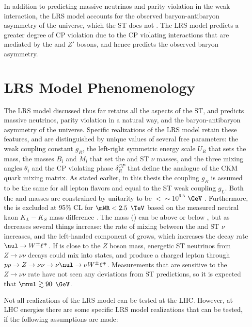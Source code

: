 In addition to predicting massive neutrinos and parity violation in the weak interaction, the LRS model accounts 
for the observed baryon-antibaryon asymmetry of the universe, which the ST does not \cite{surveyOfExtensions}.  
The LRS model predicts a greater degree of CP violation due to the CP violating interactions that are mediated by 
the \WR and $Z'$ bosons, and hence predicts the observed baryon asymmetry.


\section{LRS Model Phenomenology}
\label{sec:lrsPhenomenology}
The LRS model discussed thus far retains all the aspects of the ST, and predicts 
massive neutrinos, parity violation in a natural way, and the baryon-antibaryon asymmetry of the universe.  
Specific realizations of the LRS model retain these features, and are distinguished by unique values of 
several free parameters: the weak coupling constant $g_{R}$, the left-right symmetric energy scale $U_{R}$ 
that sets the \WR mass, the masses $B_{i}$ and $M_{i}$ that set the \nul and ST $\nu$ masses, and the three 
mixing angles $\theta_{i}$ and the CP violating phase $\delta_{R}^{CP}$ that define the \WR analogue 
of the CKM quark mixing matrix.  As stated earlier, in this thesis the coupling $g_{R}$ is assumed to be 
the same for all lepton flavors and equal to the ST weak coupling $g_{L}$.  Both the \WR and \nul masses 
are constrained by unitarity to be $< \sim10^{6.5}$ $\GeV$ \cite{lrsMassConstraints}.  Furthermore, the \WR is 
excluded at 95\% CL for $\mWR < 2.5$ $\TeV$ based on the measured neutral kaon $K_{L} - K_{S}$ mass difference 
\cite{mwrBoundFromNeutralKaons}.  The \nul mass (\mnul) can be above or below \mWR, but as \mnul decreases 
several things increase: the rate of mixing between the \nul and ST $\nu$ increases, and the left-handed 
component of \nul grows, which increases the decay rate $\nul \rightarrow W^{\pm}\ell^{\mp}$.  If \mnul is 
close to the $Z$ boson mass, energetic ST neutrinos from $Z \rightarrow \nu\nu$ decays could mix into \nul 
states, and produce a charged lepton through $pp \rightarrow Z \rightarrow \nu\nu \rightarrow \nu\nul \rightarrow \nu W^{\pm}\ell^{\mp}$.  
Measurements that are sensitive to the $Z \rightarrow \nu\nu$ rate \cite{gammaZinvisResult,higgsInvisResultsRunIandII} 
have not seen any deviations from ST predictions, so it is expected that $\mnul \gtrsim 90$ $\GeV$.

Not all realizations of the LRS model can be tested at the LHC.  However, at LHC energies there are some 
specific LRS model realizations that can be tested, if the following assumptions are made:


